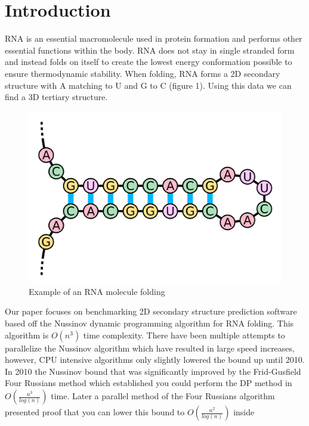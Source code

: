 \documentclass[12pt]{article}
\begin{document}
\section{Introduction}
\par RNA is an essential macromolecule used in protein formation and performs
other essential functions within the body\cite{turner}. RNA does not stay in
single stranded form and instead folds on itself to create the lowest energy
conformation possible to ensure thermodynamic stability\cite{herschlag}. When
folding, RNA forms a 2D secondary structure\cite{mccaskill} with A matching to U
and G to C (figure 1).  Using this data we can find a 3D tertiary structure\cite{mccaskill}.
\begin{figure}[ht!]
  \centering
  \includegraphics[keepaspectratio, scale=0.12]{fold-example.png}
  \caption{Example of an RNA molecule folding}
  \label{fig:RNA Folding}
\end{figure}
\par Our paper focuses on benchmarking 2D secondary structure prediction software
based off the Nussinov dynamic programming algorithm\cite{nussinov} for RNA folding.
This algorithm is $O(n^3)$ time complexity. There have been multiple attempts to
parallelize the Nussinov algorithm\cite{rizk, other-gpu} which have resulted in
large speed increases, however, CPU intensive algorithms only slightly lowered
the bound up until 2010\cite{minor-nussinov-improvement, chan}. In 2010 the
Nussinov bound that was significantly improved by the Frid-Gusfield Four Russians
method which established you could perform the DP method in $O(\frac{n^3}{log(n)})$
time\cite{gusfield}. Later a parallel method of the Four Russians algorithm
presented proof that you can lower this bound to $O(\frac{n^2}{log(n)})$ inside
\end{document}
